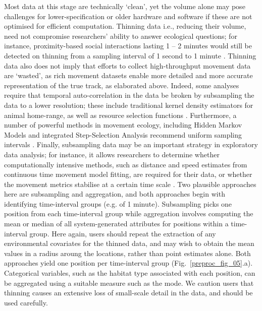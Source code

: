 Most data at this stage are technically ‘clean', yet the volume alone may pose challenges for lower-specification or older hardware and software if these are not optimised for efficient computation.
Thinning data i.e., reducing their volume, need not compromise researchers' ability to answer ecological questions; for instance, proximity-based social interactions lasting 1 -- 2 minutes would still be detected on thinning from a sampling interval of 1 second to 1 minute \citep[][]{aspillaga2021a}.
Thinning data also does not imply that efforts to collect high-throughput movement data are ‘wasted', as rich movement datasets enable more detailed and more accurate representation of the true track, as elaborated above. 
Indeed, some analyses require that temporal auto-correlation in the data be broken by subsampling the data to a lower resolution; these include traditional kernel density estimators for animal home-range, as well as resource selection functions \citep{fleming2014,manly2007,dupke2017}.
Furthermore, a number of powerful methods in movement ecology, including Hidden Markov Models and integrated Step-Selection Analysis recommend uniform sampling intervals \citep{avgar2016,langrock2012,michelot2016}.
Finally, subsampling data may be an important strategy in exploratory data analysis; for instance, it allows researchers to determine whether computationally intensive methods, such as distance and speed estimates from continuous time movement model fitting, are required for their data, or whether the movement metrics stabilise at a certain time scale \citep[][]{noonan2019}.
Two plausible approaches here are subsampling and aggregation, and both approaches begin with identifying time-interval groups (e.g. of 1 minute).
Subsampling picks one position from each time-interval group while aggregation involves computing the mean or median of all system-generated attributes for positions within a time-interval group.
Here again, users should repeat the extraction of any environmental covariates for the thinned data, and may wish to obtain the mean values in a radius aroung the locations, rather than point estimates alone.
Both approaches yield one position per time-interval group (Fig.~\ref{preproc_fig_05}.a).
Categorical variables, such as the habitat type associated with each position, can be aggregated using a suitable measure such as the mode.
We caution users that thinning causes an extensive loss of small-scale detail in the data, and should be used carefully.

